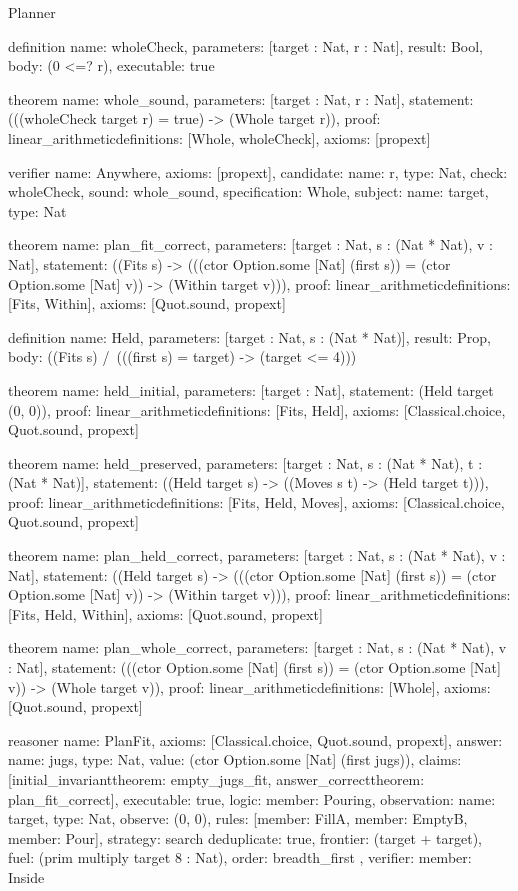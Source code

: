 \begin{lexlean}{Planner}
\begin{semanticmodule}
definition{
  name: wholeCheck,
  parameters: [target : Nat, r : Nat],
  result: Bool,
  body: (0 <=? r),
  executable: true
}

theorem{
  name: whole_sound,
  parameters: [target : Nat, r : Nat],
  statement: (((wholeCheck target r) = true) -> (Whole target r)),
  proof: linear_arithmetic{definitions: [Whole, wholeCheck]},
  axioms: [propext]
}

verifier{
  name: Anywhere,
  axioms: [propext],
  candidate: {name: r, type: Nat},
  check: wholeCheck,
  sound: whole_sound,
  specification: Whole,
  subject: {name: target, type: Nat}
}

theorem{
  name: plan_fit_correct,
  parameters: [target : Nat, s : (Nat * Nat), v : Nat],
  statement: ((Fits s) -> (((ctor Option.some [Nat] (first s)) = (ctor Option.some [Nat] v)) -> (Within target v))),
  proof: linear_arithmetic{definitions: [Fits, Within]},
  axioms: [Quot.sound, propext]
}

definition{
  name: Held,
  parameters: [target : Nat, s : (Nat * Nat)],
  result: Prop,
  body: ((Fits s) /\ (((first s) = target) -> (target <= 4)))
}

theorem{
  name: held_initial,
  parameters: [target : Nat],
  statement: (Held target (0, 0)),
  proof: linear_arithmetic{definitions: [Fits, Held]},
  axioms: [Classical.choice, Quot.sound, propext]
}

theorem{
  name: held_preserved,
  parameters: [target : Nat, s : (Nat * Nat), t : (Nat * Nat)],
  statement: ((Held target s) -> ((Moves s t) -> (Held target t))),
  proof: linear_arithmetic{definitions: [Fits, Held, Moves]},
  axioms: [Classical.choice, Quot.sound, propext]
}

theorem{
  name: plan_held_correct,
  parameters: [target : Nat, s : (Nat * Nat), v : Nat],
  statement: ((Held target s) -> (((ctor Option.some [Nat] (first s)) = (ctor Option.some [Nat] v)) -> (Within target v))),
  proof: linear_arithmetic{definitions: [Fits, Held, Within]},
  axioms: [Quot.sound, propext]
}

theorem{
  name: plan_whole_correct,
  parameters: [target : Nat, s : (Nat * Nat), v : Nat],
  statement: (((ctor Option.some [Nat] (first s)) = (ctor Option.some [Nat] v)) -> (Whole target v)),
  proof: linear_arithmetic{definitions: [Whole]},
  axioms: [Quot.sound, propext]
}

reasoner{
  name: PlanFit,
  axioms: [Classical.choice, Quot.sound, propext],
  answer: {name: jugs, type: Nat, value: (ctor Option.some [Nat] (first jugs))},
  claims: [initial_invariant{theorem: empty_jugs_fit}, answer_correct{theorem: plan_fit_correct}],
  executable: true,
  logic: {member: Pouring},
  observation: {name: target, type: Nat},
  observe: (0, 0),
  rules: [{member: FillA}, {member: EmptyB}, {member: Pour}],
  strategy: search{
    deduplicate: true,
    frontier: (target + target),
    fuel: (prim multiply target 8 : Nat),
    order: breadth_first
  },
  verifier: {member: Inside}
}


\end{semanticmodule}
\end{lexlean}
